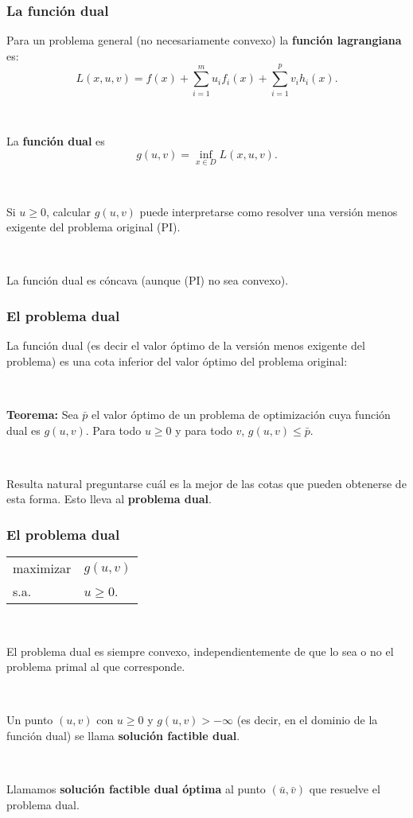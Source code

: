 \documentclass{beamer}
\begin{document}
\begin{frame}
\frametitle{La función dual}

Para un problema general (no necesariamente convexo) la \textbf{función lagrangiana} es:
\[
L(x,u,v) = f(x) + \sum_{i=1}^m u_i f_i(x) + \sum_{i=1}^p v_i h_i(x).
\]


\


La \textbf{función dual} es 
\[
g(u,v) = \inf_{x\in D} L(x,u,v).
\] 



\

Si $u\geq 0$, calcular $g(u,v)$ puede interpretarse como resolver una versión menos exigente del problema original (PI).


\

La función dual es cóncava (aunque (PI) no sea convexo).


\end{frame}
\begin{frame}
\frametitle{El problema dual}

La función dual (es decir el valor óptimo de la versión menos exigente del problema) es una cota inferior del valor óptimo del problema original:

\

{\bf Teorema:} Sea $\bar{p}$ el valor óptimo de un problema de optimización cuya función dual es $g(u,v)$. Para todo $u\geq 0$ y para todo $v$, $g(u,v)\leq \bar{p}$.

\

Resulta natural preguntarse cuál es la mejor de las cotas que pueden obtenerse de esta forma. Esto lleva al \textbf{problema dual}.






\end{frame}
\begin{frame}
\frametitle{El problema dual}


\begin{center}
\begin{tabular}{ll}
maximizar & $g(u,v)$ \\
s.a. & $u\geq 0$.    
\end{tabular}
\end{center}

\


El problema dual es siempre convexo, independientemente de que lo sea o no el problema primal al que corresponde.

\

Un punto $(u,v)$ con $u\geq 0$ y $g(u,v)>-\infty$ (es decir, en el dominio de la función dual) se llama \textbf{solución factible dual}.

\

Llamamos \textbf{solución factible dual óptima} al punto $(\bar{u},\bar{v})$ que resuelve el problema dual.


\end{frame}
\end{document}
